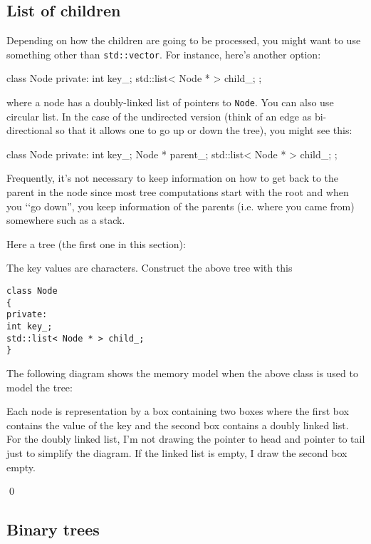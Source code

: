 \newpage
\subsection{List of children}

Depending on how the children 
are going to be processed, 
you might want to use something other than 
\verb!std::vector!.
For instance, here's another option:
\begin{console}
class Node 
{
private:
    int key_;
    std::list< Node * > child_;
};
\end{console}
where a node has a doubly-linked list of 
pointers to \verb!Node!.
You can also use circular list.
In the case of the undirected version (think of an edge
as bi-directional so that it allows one to go up or down the tree), 
you might see this:
\begin{console}
class Node 
{
private:
    int key_;
    Node * parent_;
    std::list< Node * > child_;
};
\end{console}
Frequently, it's not necessary to keep information on how to get back to 
the parent in the node since most tree 
computations start with the root and when you 
\lq\lq go down'', you keep information of the parents (i.e. where
you came from) somewhere such as a stack.

\begin{ex}
  Here a tree (the first one in this section):

  
  
The key values are characters.
Construct the above tree with this
\begin{Verbatim}[frame=single]
class Node
{
private:
int key_;
std::list< Node * > child_;
}
\end{Verbatim}

The following diagram shows the memory model when the above class
is used to model the tree:



Each node is representation by a box containing two boxes
where the first box contains the value of the key and the second
box contains a doubly linked list.
For the doubly linked list, I'm not drawing the pointer to
head and pointer to tail just to simplify the diagram.
If the linked list is empty, I draw the second box empty.

\qed
\end{ex}


\newpage
\subsection{Binary trees}

